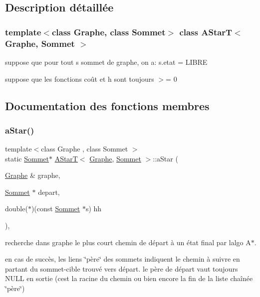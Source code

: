 \subsection{Description détaillée}
\subsubsection*{template$<$class Graphe, class Sommet$>$\newline
class A\+Star\+T$<$ Graphe, Sommet $>$}

suppose que pour tout s sommet de graphe, on a\+: s.\+etat = L\+I\+B\+RE 

suppose que les fonctions coût et h sont toujours $>$= 0 

\subsection{Documentation des fonctions membres}
\mbox{\label{class_a_star_t_aec39a6d52f7a7941175e246fff59b7f0}} 
\subsubsection{\texorpdfstring{aStar()}{aStar()}}
{\footnotesize\ttfamily template$<$class Graphe , class Sommet $>$ \\
static \mbox{\hyperlink{class_sommet}{Sommet}}$\ast$ \mbox{\hyperlink{class_a_star_t}{A\+StarT}}$<$ \mbox{\hyperlink{class_graphe}{Graphe}}, \mbox{\hyperlink{class_sommet}{Sommet}} $>$\+::a\+Star (\begin{DoxyParamCaption}\item[{\mbox{\hyperlink{class_graphe}{Graphe}} \&}]{graphe,  }\item[{\mbox{\hyperlink{class_sommet}{Sommet}} $\ast$}]{depart,  }\item[{double($\ast$)(const \mbox{\hyperlink{class_sommet}{Sommet}} $\ast$s)}]{hh }\end{DoxyParamCaption})\hspace{0.3cm}{\ttfamily [inline]}, {\ttfamily [static]}}



recherche dans graphe le plus court chemin de départ à un état final par l\textquotesingle{}algo A$\ast$. 

en cas de succès, les liens \char`\"{}père\char`\"{} des sommets indiquent le chemin à suivre en partant du sommet-\/cible trouvé vers départ. le père de départ vaut toujours N\+U\+LL en sortie (c\textquotesingle{}est la racine du chemin ou bien encore la fin de la liste chaînée \char`\"{}père\char`\"{})

